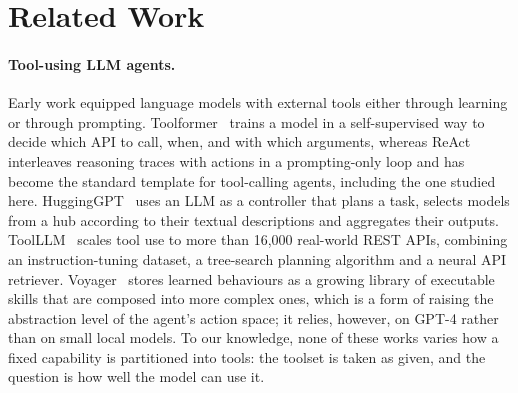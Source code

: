 \section{Related Work}
\label{sec:related}

\paragraph{Tool-using LLM agents.}
Early work equipped language models with external tools either through learning or through prompting. Toolformer~\citep{schick2023toolformer} trains a model in a self-supervised way to decide which API to call, when, and with which arguments, whereas ReAct~\citep{yao2023react} interleaves reasoning traces with actions in a prompting-only loop and has become the standard template for tool-calling agents, including the one studied here. HuggingGPT~\citep{shen2023hugginggpt} uses an LLM as a controller that plans a task, selects models from a hub according to their textual descriptions and aggregates their outputs. ToolLLM~\citep{qin2024toolllm} scales tool use to more than 16{,}000 real-world REST APIs, combining an instruction-tuning dataset, a tree-search planning algorithm and a neural API retriever. Voyager~\citep{wang2023voyager} stores learned behaviours as a growing library of executable skills that are composed into more complex ones, which is a form of raising the abstraction level of the agent's action space; it relies, however, on GPT-4 rather than on small local models. To our knowledge, none of these works varies how a fixed capability is partitioned into tools: the toolset is taken as given, and the question is how well the model can use it.

